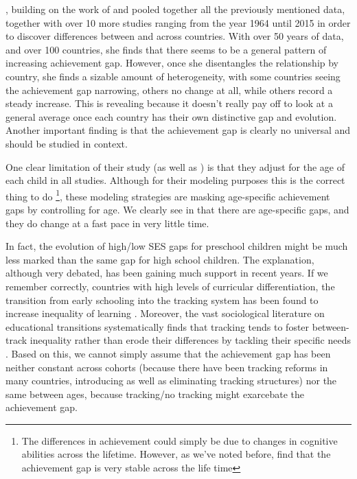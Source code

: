 \documentclass[11pt, a4paper]{article}\usepackage[]{graphicx}\usepackage[]{color}
\begin{document}
\citet{anna2016_global}, building on the work of \citet{anna2016} and \citet{reardon_portilla} pooled together all the previously mentioned data, together with over 10 more studies ranging from the year 1964 until 2015 in order to discover differences between and across countries. With over 50 years of data, and over 100 countries, she finds that there seems to be a general pattern of increasing achievement gap. However, once she disentangles the relationship by country, she finds a sizable amount of heterogeneity, with some countries seeing the achievement gap narrowing, others no change at all, while others record a steady increase. This is revealing because it doesn't really pay off to look at a general average once each country has their own distinctive gap and evolution. Another important finding is that the achievement gap is clearly no universal and should be studied in context. 

One clear limitation of their study (as well as \citet{reardon2011}) is that they adjust for the age of each child in all studies. Although for their modeling purposes this is the correct thing to do \footnote{The differences in achievement could simply be due to changes in cognitive abilities across the lifetime. However, as we've noted before, \citet{bradbury2015} find that the achievement gap is very stable across the life time}, these modeling strategies are masking age-specific achievement gaps by controlling for age. We clearly see in \citet{reardon_portilla} that there are age-specific gaps, and they do change at a fast pace in very little time.

In fact, the evolution of high/low SES gaps for preschool children might be much less marked than the same gap for high school children. The explanation, although very debated, has been gaining much support in recent years. If we remember correctly, countries with high levels of curricular differentiation, the transition from early schooling into the tracking system has been found to increase inequality of learning \citep{hanushek_woesmann_tracking}. Moreover, the vast sociological literature on educational transitions systematically finds that tracking tends to foster between-track inequality rather than erode their differences by tackling their specific needs \citep{werfhorst_mijs}. Based on this, we cannot simply assume that the achievement gap has been neither constant across cohorts (because there have been tracking reforms in many countries, introducing as well as eliminating tracking structures) nor the same between ages, because tracking/no tracking might exarcebate the achievement gap.
\end{document}
